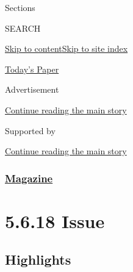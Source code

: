 Sections

SEARCH

\protect\hyperlink{site-content}{Skip to
content}\protect\hyperlink{site-index}{Skip to site index}

\href{https://myaccount.nytimes3xbfgragh.onion/auth/login?response_type=cookie\&client_id=vi}{}

\href{https://www.nytimes3xbfgragh.onion/section/todayspaper}{Today's
Paper}

Advertisement

\protect\hyperlink{after-top}{Continue reading the main story}

Supported by

\protect\hyperlink{after-sponsor}{Continue reading the main story}

\hypertarget{magazine}{%
\subsubsection{\texorpdfstring{\href{/section/magazine}{Magazine}}{Magazine}}\label{magazine}}

\hypertarget{5618-issue}{%
\section{5.6.18 Issue}\label{5618-issue}}

\hypertarget{highlights}{%
\subsection{Highlights}\label{highlights}}

